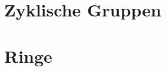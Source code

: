 \documentclass[a4paper, 11pt, chapterprefix]{scrreprt}
\numberwithin{themcount}{section}
\begin{document}
\setlength\abovedisplayshortskip{3pt}
\setlength\belowdisplayshortskip{3pt}
\setlength\abovedisplayskip{3pt}
\setlength\belowdisplayskip{3pt}

\section{Zyklische Gruppen}


\newpage
\section{Ringe}

\end{document}
